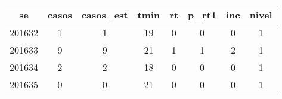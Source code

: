 \begin{tabular}{c|ccccccc}
  \hline
se & casos & casos\_est & tmin & rt & p\_rt1 & inc & nivel \\ 
  \hline
201632 & 1 & 1 & 19 & 0 & 0 & 0 & 1 \\ 
  201633 & 9 & 9 & 21 & 1 & 1 & 2 & 1 \\ 
  201634 & 2 & 2 & 18 & 0 & 0 & 0 & 1 \\ 
  201635 & 0 & 0 & 21 & 0 & 0 & 0 & 1 \\ 
   \hline
\end{tabular}
